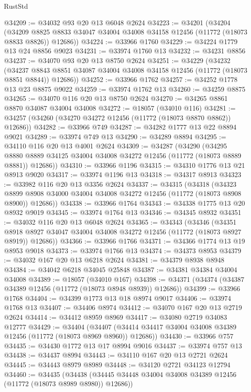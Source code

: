 \begin{lexlean}{RustStd}
\begin{coremodule}
@34209 := @34032 @93 @20 @13 @6048 @2624
@34223 := @34201
    (@34204
      (@34209 @8825 @8833 @34047 @34004 @34008 @34158 @12456 (@11772 (@18073 @8833 @8826)) @12686))
@34224 := @33966 @1760
@34229 := @34224 @1779 @13 @24 @8856 @9023
@34231 := @33974 @1760 @13
@34232 := @34231 @8856
@34237 := @34070 @93 @20 @13 @8750 @2624
@34251 := @34229
    (@34232
      (@34237 @8843 @8851 @34087 @34004 @34008 @34158 @12456 (@11772 (@18073 @8851 @8844)) @12686))
@34252 := @33966 @1762
@34257 := @34252 @1778 @13 @23 @8875 @9022
@34259 := @33974 @1762 @13
@34260 := @34259 @8875
@34265 := @34070 @116 @20 @13 @8750 @2624
@34270 := @34265 @8861 @8870 @34087 @34004 @34008
@34272 := @18057 (@34010 @116)
@34281 := @34257 (@34260 (@34270 @34272 @12456 (@11772 (@18073 @8870 @8862)) @12686))
@34282 := @33966 @749
@34287 := @34282 @1777 @13 @22 @8894 @9021
@34289 := @33974 @749 @13
@34290 := @34289 @8894
@34295 := @34110 @116 @20 @13 @4001 @2624
@34309 := @34287
    (@34290
      (@34295 @8880 @8889 @34125 @34004 @34008 @34272 @12456 (@11772 (@18073 @8889 @8881)) @12686))
@34310 := @33966 @1196
@34315 := @34310 @1776 @13 @21 @8913 @9020
@34317 := @33974 @1196 @13
@34318 := @34317 @8913
@34323 := @33982 @116 @20 @13 @3356 @2624
@34337 := @34315
    (@34318
      (@34323 @8899 @8908 @34000 @34004 @34008 @34272 @12456 (@11772 (@18073 @8908 @8900)) @12686))
@34338 := @33966 @1764
@34343 := @34338 @1775 @13 @20 @8932 @9019
@34345 := @33974 @1764 @13
@34346 := @34345 @8932
@34351 := @34032 @116 @20 @13 @6048 @2624
@34365 := @34343
    (@34346
      (@34351 @8918 @8927 @34047 @34004 @34008 @34272 @12456 (@11772 (@18073 @8927 @8919)) @12686))
@34366 := @33966 @1766
@34371 := @34366 @1774 @13 @19 @8953 @9018
@34373 := @33974 @1766 @13
@34374 := @34373 @8953
@34379 := @34032 @167 @20 @13 @6218 @2624
@34381 := @34379 @8938 @8948
@34384 := @34042 @6218 @34045 @25848
@34387 := @34381 @34384 @34004 @34008
@34389 := @18057 (@34010 @167)
@34398 := @34371 (@34374 (@34387 @34389 @12456 (@11772 (@18073 @8948 @8939)) @12686))
@34399 := @33966 @1768
@34404 := @34399 @1773 @13 @18 @8974 @9017
@34406 := @33974 @1768 @13
@34407 := @34406 @8974
@34412 := @34070 @167 @20 @13 @2719 @2624
@34414 := @34412 @8959 @8969
@34417 := @34080 @2719 @34083 @12777
@34429 := @34404
    (@34407 (@34414 @34417 @34004 @34008 @34389 @12456 (@11772 (@18073 @8969 @8960)) @12686))
@34430 := @33966 @757
@34435 := @34430 @1772 @13 @17 @8994 @9016
@34437 := @33974 @757 @13
@34438 := @34437 @8994
@34443 := @34110 @167 @20 @13 @2721 @2624
@34445 := @34443 @8979 @8989
@34448 := @34120 @2721 @34123 @12794
@34460 := @34435
    (@34438 (@34445 @34448 @34004 @34008 @34389 @12456 (@11772 (@18073 @8989 @8980)) @12686))

\end{coremodule}
\end{lexlean}
